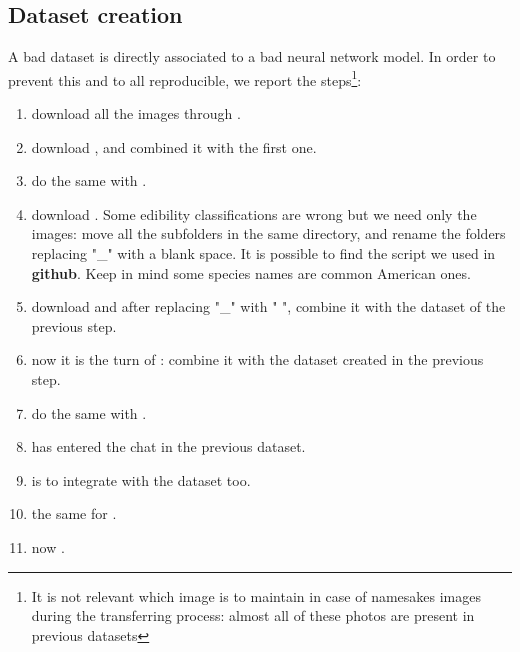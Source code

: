 \documentclass[conference]{IEEEtran}
\begin{document}
\subsection{Dataset creation}
A bad dataset is directly associated to a bad neural network model. In order to prevent this and to all reproducible, we report the steps\footnote{It is not relevant which image is to maintain in case of namesakes images during the transferring process: almost all of these photos are present in previous datasets}:
\begin{enumerate}
	\item download all the images through \cite{mushroomobserver}.
	
	\item download \cite{keplab_mo106}, and combined it with the first one.
	
	\item do the same with \cite{kaggle_mushroom_species}.
	
	\item download \cite{kaggle_mushroom_classification_zedsden}. Some edibility classifications are wrong but we need only the images: move all the subfolders in the same directory, and rename the folders replacing "\_" with a blank space. It is possible to find the script we used in \textbf{github}. Keep in mind some species names are common American ones.
	
	\item download \cite{kaggle_mushroom_images_215} and after replacing "\_" with " ", combine it with the dataset of the previous step.
	
	\item now it is the turn of \cite{kaggle_mushrooms_specified}: combine it with the dataset created in the previous step.
	
	\item do the same with \cite{kaggle_edible_poisonous_mushrooms}.
	
	\item \cite{kaggle_mushroom_pictures} has entered the chat in the previous dataset.
	
	\item \cite{kaggle_mo_106} is to integrate with the dataset too.
	
	\item the same for \cite{kaggle_edible_non_edible_toxic_mushrooms}.
	
	\item now \cite{kaggle_mushrooms_classification_gaurav}.
	

\end{enumerate}
\end{document}
